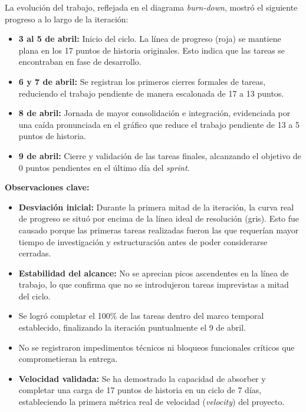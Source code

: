 La evolución del trabajo, reflejada en el diagrama \textit{burn-down}, mostró el siguiente progreso a lo largo de la iteración:

\begin{itemize}
    \item \textbf{3 al 5 de abril:} Inicio del ciclo. La línea de progreso (roja) se mantiene plana en los 17 puntos de historia originales. Esto indica que las tareas se encontraban en fase de desarrollo.
    \item \textbf{6 y 7 de abril:} Se registran los primeros cierres formales de tareas, reduciendo el trabajo pendiente de manera escalonada de 17 a 13 puntos.
    \item \textbf{8 de abril:} Jornada de mayor consolidación e integración, evidenciada por una caída pronunciada en el gráfico que reduce el trabajo pendiente de 13 a 5 puntos de historia.
    \item \textbf{9 de abril:} Cierre y validación de las tareas finales, alcanzando el objetivo de 0 puntos pendientes en el último día del \textit{sprint}.
\end{itemize}


\noindent\textbf{Observaciones clave:}
\begin{itemize}
    \item \textbf{Desviación inicial:} Durante la primera mitad de la iteración, la curva real de progreso se situó por encima de la línea ideal de resolución (gris). Esto fue causado porque las primeras tareas realizadas fueron las que requerían mayor tiempo de investigación y estructuración antes de poder considerarse cerradas.
    \item \textbf{Estabilidad del alcance:} No se aprecian picos ascendentes en la línea de trabajo, lo que confirma que no se introdujeron tareas imprevistas a mitad del ciclo.
    \item Se logró completar el 100\% de las tareas dentro del marco temporal establecido, finalizando la iteración puntualmente el 9 de abril.
    \item No se registraron impedimentos técnicos ni bloqueos funcionales críticos que comprometieran la entrega.
    \item \textbf{Velocidad validada:} Se ha demostrado la capacidad de absorber y completar una carga de 17 puntos de historia en un ciclo de 7 días, estableciendo la primera métrica real de velocidad (\textit{velocity}) del proyecto.
\end{itemize}

